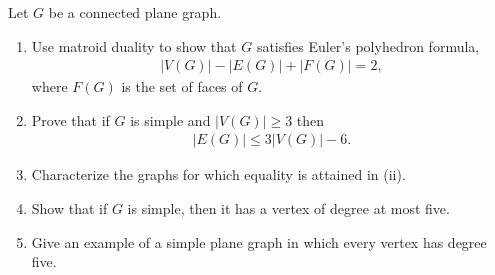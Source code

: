 \prob
{
    Let $G$ be a connected plane graph.
    \begin{enumerate}[label=(\roman*)]
        \item Use matroid duality to show that $G$ satisfies Euler's polyhedron formula,
                \begin{align}
                        |V(G)| - |E(G)| + |F(G)| = 2,
                \end{align}
                where $F(G)$ is the set of faces of $G$.
        \item Prove that if $G$ is simple and $|V(G)| \geq 3$ then
                \begin{align}
                    |E(G)| \leq 3|V(G)| - 6.
                \end{align}
                
        \item Characterize the graphs for which equality is attained in (ii).
        
        \item Show that if $G$ is simple, then it has a vertex of degree at most five.
        
        \item Give an example of a simple plane graph in which every vertex has degree five.
    \end{enumerate}
}
